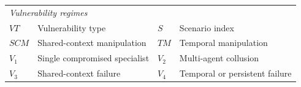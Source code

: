 \begin{table}[!ht]
\begin{tabular}{llll}
\midrule
\multicolumn{4}{l}{\textit{Vulnerability regimes}} \\
$VT$ & Vulnerability type & $S$ & Scenario index \\
$SCM$ & Shared-context manipulation & $TM$ & Temporal manipulation \\
$V_1$ & Single compromised specialist & $V_2$ & Multi-agent collusion \\
$V_3$ & Shared-context failure & $V_4$ & Temporal or persistent failure \\

\bottomrule
\end{tabular}
\end{table}
